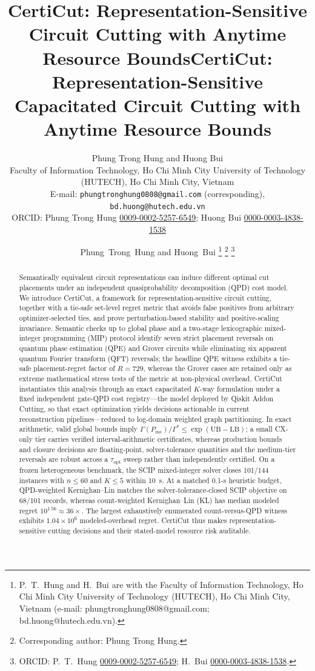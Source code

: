 \documentclass[11pt]{article}
\title{CertiCut: Representation-Sensitive Circuit Cutting with Anytime Resource Bounds}
\title{CertiCut: Representation-Sensitive Capacitated Circuit Cutting with Anytime Resource Bounds}
\author{Phung Trong Hung and Huong Bui\\Faculty of Information Technology, Ho Chi Minh City University of Technology (HUTECH), Ho Chi Minh City, Vietnam\\E-mail: \texttt{phungtronghung0808@gmail.com} (corresponding), \texttt{bd.huong@hutech.edu.vn}\\ORCID: Phung Trong Hung \href{https://orcid.org/0009-0002-5257-6549}{0009-0002-5257-6549}; Huong Bui \href{https://orcid.org/0000-0003-4838-1538}{0000-0003-4838-1538}}
\date{}
\author{Phung~Trong~Hung and Huong~Bui%
\thanks{P.~T.~Hung and H.~Bui are with the Faculty of Information Technology, Ho Chi Minh City University of Technology (HUTECH), Ho Chi Minh City, Vietnam (e-mail: phungtronghung0808@gmail.com; bd.huong@hutech.edu.vn).}%
\thanks{Corresponding author: Phung Trong Hung.}%
\thanks{ORCID: P.~T.~Hung \href{https://orcid.org/0009-0002-5257-6549}{0009-0002-5257-6549}; H.~Bui \href{https://orcid.org/0000-0003-4838-1538}{0000-0003-4838-1538}.}}
\newcommand{\CertiCut}{CertiCut}
\newcommand{\CertiCut}{\textsc{CertiCut}}
\newcommand{\LB}{\mathrm{LB}}
\newcommand{\UB}{\mathrm{UB}}
\begin{document}
\maketitle

\begin{abstract}
Semantically equivalent circuit representations can induce different optimal cut placements under an independent quasiprobability decomposition (QPD) cost model. We introduce \CertiCut{}, a framework for representation-sensitive circuit cutting, together with a tie-safe set-level regret metric that avoids false positives from arbitrary optimizer-selected ties, and prove perturbation-based stability and positive-scaling invariance. Semantic checks up to global phase and a two-stage lexicographic mixed-integer programming (MIP) protocol identify seven strict placement reversals on quantum phase estimation (QPE) and Grover circuits while eliminating six apparent quantum Fourier transform (QFT) reversals; the headline QPE witness exhibits a tie-safe placement-regret factor of $R=729$, whereas the Grover cases are retained only as extreme mathematical stress tests of the metric at non-physical overhead. \CertiCut{} instantiates this analysis through an exact capacitated $K$-way formulation under a fixed independent gate-QPD cost registry---the model deployed by Qiskit Addon Cutting, so that exact optimization yields decisions actionable in current reconstruction pipelines---reduced to log-domain weighted graph partitioning. In exact arithmetic, valid global bounds imply $\Gamma(P_{\mathrm{inc}})/\Gamma^*\le\exp(\UB-\LB)$; a small CX-only tier carries verified interval-arithmetic certificates, whereas production bounds and closure decisions are floating-point, solver-tolerance quantities and the medium-tier reversals are robust across a $\tau_{\mathrm{opt}}$ sweep rather than independently certified. On a frozen heterogeneous benchmark, the SCIP mixed-integer solver closes 101/144 instances with $n\le60$ and $K\le5$ within 10~s. At a matched 0.1-s heuristic budget, QPD-weighted Kernighan--Lin matches the solver-tolerance-closed SCIP objective on 68/101 records, whereas count-weighted Kernighan--Lin (KL) has median modeled regret $10^{1.56}\approx36\times$. The largest exhaustively enumerated count-versus-QPD witness exhibits $1.04\times10^6$ modeled-overhead regret. \CertiCut{} thus makes representation-sensitive cutting decisions and their stated-model resource risk auditable.
\end{abstract}
\end{document}
